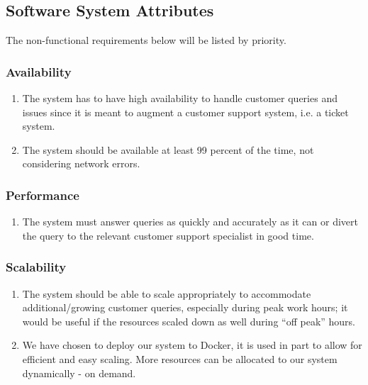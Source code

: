 \documentclass[11pt]{article}
\begin{document}
\subsection{Software System Attributes}%

The non-functional requirements below will be listed by priority.

\subsubsection{Availability}
\begin{enumerate}
	\item The system has to have high availability to handle customer queries and issues since it is meant to augment a customer support system, i.e. a ticket system.
	\item The system should be available at least 99 percent of the time, not considering network errors.
\end{enumerate}


\subsubsection{Performance}
\begin{enumerate}
	\item The system must answer queries as quickly and accurately as it can or divert the query to the relevant customer support specialist in good time. 
\end{enumerate}

\subsubsection{Scalability}
\begin{enumerate}
	\item The system should be able to scale appropriately to accommodate additional/growing customer queries, especially during peak work hours; it would be useful if the resources scaled down as well during “off peak” hours.
	\item We have chosen to deploy our system to Docker, it is used in part to allow for efficient and easy scaling. More resources can be allocated to our system dynamically - on demand.
\end{enumerate}
\end{document}
